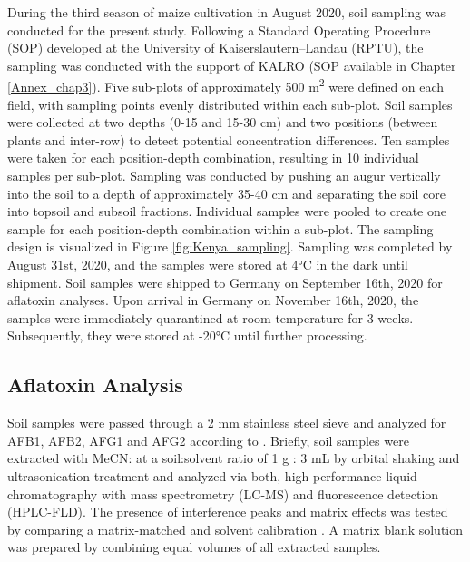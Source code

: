 \begin{refsection}
During the third season of maize cultivation in August 2020, soil sampling was conducted for the present study. Following a Standard Operating Procedure (SOP) developed at the University of Kaiserslautern--Landau (RPTU), the sampling was conducted with the support of KALRO (SOP available in Chapter \ref{Annex_chap3}). Five sub-plots of approximately 500 m\textsuperscript{2} were defined on each field, with sampling points evenly distributed within each sub-plot. Soil samples were collected at two depths (0-15 and 15-30 cm) and two positions (between plants and inter-row) to detect potential concentration differences. Ten samples were taken for each position-depth combination, resulting in 10 individual samples per sub-plot. Sampling was conducted by pushing an augur vertically into the soil to a depth of approximately 35-40 cm and separating the soil core into topsoil and subsoil fractions. Individual samples were pooled to create one sample for each position-depth combination within a sub-plot. The sampling design is visualized in Figure \ref{fig:Kenya_sampling}. Sampling was completed by August 31st, 2020, and the samples were stored at 4°C in the dark until shipment. Soil samples were shipped to Germany on September 16th, 2020 for aflatoxin analyses. Upon arrival in Germany on November 16th, 2020, the samples were immediately quarantined at room temperature for 3 weeks. Subsequently, they were stored at -20°C until further processing.


\subsection{Aflatoxin Analysis}

Soil samples were passed through a 2 mm stainless steel sieve and analyzed for AFB1, AFB2, AFG1 and AFG2 according to \citet{albert2021validation}. Briefly, soil samples were extracted with MeCN: at a soil:solvent ratio of 1 g : 3 mL by orbital shaking and ultrasonication treatment and analyzed via both, high performance liquid chromatography with mass spectrometry (LC-MS) and fluorescence detection (HPLC-FLD). The presence of interference peaks and matrix effects was tested by comparing a matrix-matched and solvent calibration \citep{albert2021validation}. A matrix blank solution was prepared by combining equal volumes of all extracted samples.


\end{refsection}
